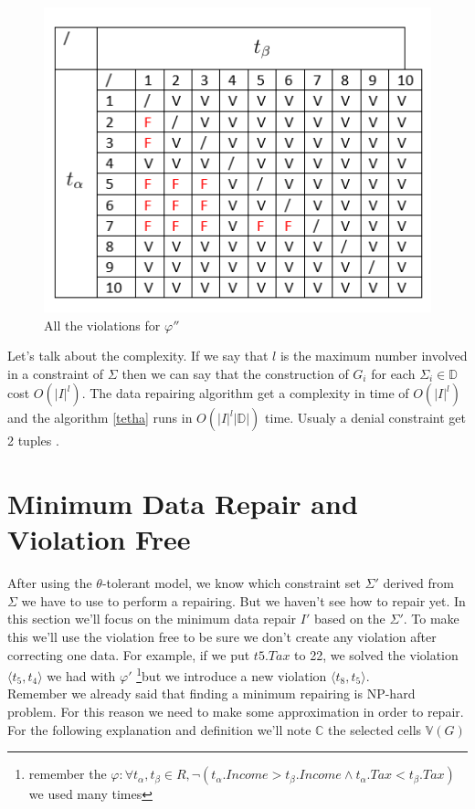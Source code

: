 \documentclass[letterpaper, 12pt]{report}
\begin{document}
\begin{figure}
\centering
\includegraphics[scale=1]{img/TaxEqual}
\caption{\label{EqualTax}All the violations for $\varphi''$}
\end{figure}

Let's talk about the complexity. If we say that $l$ is the maximum number involved in a constraint of $\Sigma$ then we can say that the construction of $G_i$ for each $\Sigma_i \in \mathbb{D}$ cost $O(|I|^l)$. The data repairing algorithm get a complexity in time of $O(|I|^l)$ and the algorithm \ref{tetha} runs in $O(|I|^l|\mathbb{D}|)$ time. Usualy a denial constraint get 2 tuples \cite{main}.

\section{Minimum Data Repair and Violation Free}

After using the $\theta$-tolerant model, we know which constraint set $\Sigma'$ derived from $\Sigma$ we have to use to perform a repairing. But we haven't see how to repair yet. In this section we'll focus on the minimum data repair $I'$ based on the $\Sigma'$. To make this we'll use the violation free to be sure we don't create any violation after correcting one data. For example, if we put $t5.Tax$ to 22, we solved the violation $ \langle t_5,t_4 \rangle$ we had with $\varphi'$ \footnote{remember the $\varphi: \forall t_\alpha,t_\beta \in R , \neg(t_\alpha.Income > t_\beta.Income \wedge t_\alpha.Tax < t_\beta.Tax)$ we used many times}but we introduce a new violation $\langle t_8,t_5 \rangle$.\\

Remember we already said that finding a minimum repairing is NP-hard problem. For this reason we need to make some approximation in order to repair. For the following explanation and definition we'll note $\mathbb{C}$ the selected cells $\mathbb{V}(G)$
\end{document}
